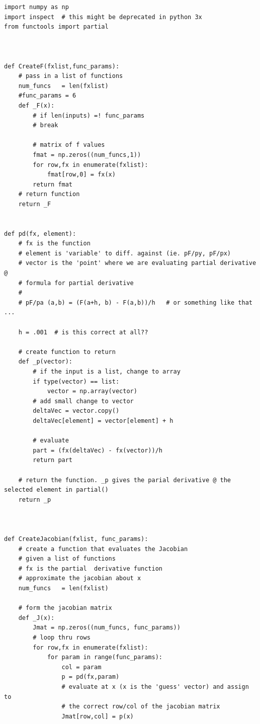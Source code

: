 \documentclass{article}
\begin{document}
\begin{verbatim}
import numpy as np
import inspect  # this might be deprecated in python 3x
from functools import partial



def CreateF(fxlist,func_params):
    # pass in a list of functions 
    num_funcs   = len(fxlist)
    #func_params = 6 
    def _F(x):
        # if len(inputs) =! func_params
        # break 
        
        # matrix of f values 
        fmat = np.zeros((num_funcs,1))
        for row,fx in enumerate(fxlist):
            fmat[row,0] = fx(x)
        return fmat 
    # return function
    return _F


def pd(fx, element):
    # fx is the function
    # element is 'variable' to diff. against (ie. pF/py, pF/px)
    # vector is the 'point' where we are evaluating partial derivative @ 
    # formula for partial derivative 
    # 
    # pF/pa (a,b) = (F(a+h, b) - F(a,b))/h   # or something like that ...

    h = .001  # is this correct at all??  
    
    # create function to return 
    def _p(vector):
        # if the input is a list, change to array
        if type(vector) == list:
            vector = np.array(vector)
        # add small change to vector     
        deltaVec = vector.copy()
        deltaVec[element] = vector[element] + h 
        
        # evaluate
        part = (fx(deltaVec) - fx(vector))/h
        return part  
    
    # return the function. _p gives the parial derivative @ the selected element in partial()
    return _p



def CreateJacobian(fxlist, func_params):
    # create a function that evaluates the Jacobian 
    # given a list of functions 
    # fx is the partial  derivative function
    # approximate the jacobian about x
    num_funcs   = len(fxlist)

    # form the jacobian matrix 
    def _J(x):
        Jmat = np.zeros((num_funcs, func_params))      
        # loop thru rows
        for row,fx in enumerate(fxlist):
            for param in range(func_params):
                col = param
                p = pd(fx,param)
                # evaluate at x (x is the 'guess' vector) and assign to 
                # the correct row/col of the jacobian matrix 
                Jmat[row,col] = p(x) 
                

\end{verbatim}
\end{document}
